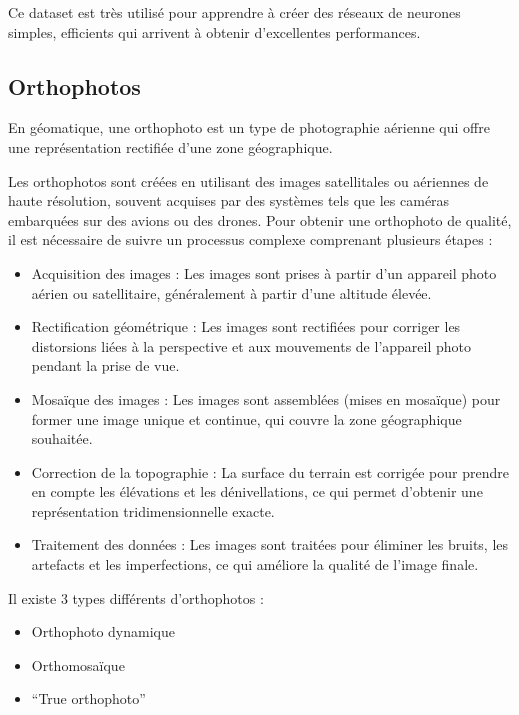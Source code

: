 Ce dataset est très utilisé pour apprendre à créer des réseaux de neurones simples, efficients qui arrivent à obtenir d'excellentes performances.

\newpage
\subsection{Orthophotos}
\label{subsec:annexe_ortophotos}

En géomatique, une orthophoto est un type de photographie aérienne qui offre une représentation rectifiée d'une zone géographique.

Les orthophotos sont créées en utilisant des images satellitales ou aériennes de haute résolution, souvent acquises par des systèmes tels que les caméras embarquées sur des avions ou des drones. Pour obtenir une orthophoto de qualité, il est nécessaire de suivre un processus complexe comprenant plusieurs étapes :
\begin{itemize}
    \item Acquisition des images : Les images sont prises à partir d'un appareil photo aérien ou satellitaire, généralement à partir d'une altitude élevée.
    \item Rectification géométrique : Les images sont rectifiées pour corriger les distorsions liées à la perspective et aux mouvements de l'appareil photo pendant la prise de vue.
    \item Mosaïque des images : Les images sont assemblées (mises en mosaïque) pour former une image unique et continue, qui couvre la zone géographique souhaitée.
    \item Correction de la topographie : La surface du terrain est corrigée pour prendre en compte les élévations et les dénivellations, ce qui permet d'obtenir une représentation tridimensionnelle exacte.
    \item Traitement des données : Les images sont traitées pour éliminer les bruits, les artefacts et les imperfections, ce qui améliore la qualité de l'image finale.
\end{itemize}

Il existe 3 types différents d'orthophotos \cite{barrette_different_2022} :
\begin{itemize}
    \item Orthophoto dynamique
    \item Orthomosaïque
    \item ``True orthophoto''
\end{itemize}

